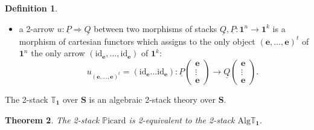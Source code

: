 \documentclass[11pt]{amsart}
\newcommand{\PICARD}{\mathbb{P}\mathrm{icard}}
\newcommand{\id}{\mathrm{id}}
\newcommand{\bS}{\textbf{S}}
\newcommand{\bfu}{\textbf{1}}
\newcommand{\twoT}{\mathbb{T}}
\newcommand{\Alg}{\mathrm{Alg}}
\newtheorem{theorem}{Theorem}[section]
\theoremstyle{definition}
\newtheorem{definition}[theorem]{Definition}
\numberwithin{equation}{section}
\begin{document}
\begin{definition}
\begin{itemize}
	$QP$ is the product of the two matrices $Q$ and $P$.
	\item a 2-arrow $u: \underline{P} \Rightarrow \underline{Q}$ between two morphisms of stacks $\underline {Q}, \underline{P}: \bfu^n \to \bfu^k$ is a morphism of cartesian functors which assigns to the only object $(\mathbf{e}, \dots, \mathbf{e})^t$ of $\bfu^n$ the only arrow  $(\id_\mathbf{e}, \dots, \id_\mathbf{e})$ of $\bfu^k$:
	\begin{equation}\label{arrow1^k}
\qquad		u_{(\mathbf{e}, \dots, \mathbf{e})^t} = ( \id_\mathbf{e} \dots \id_\mathbf{e}) :  \underline{P} \left(\begin{matrix} \mathbf{e} \\ \vdots \\ \mathbf{e}\end{matrix}\right) \longrightarrow   \underline{Q} \left(\begin{matrix} \mathbf{e} \\ \vdots \\ \mathbf{e}\end{matrix}\right).
	\end{equation}	
\end{itemize}
\end{definition}

 The 2-stack $\twoT_{\bfu}$ over $\bS$ is an algebraic 2-stack theory over $\bS$.


\begin{theorem}\label{Teo}
	The 2-stack $\PICARD$ is 2-equivalent to the 2-stack $\Alg \twoT_{\bfu} .$ 
\end{theorem}
\end{document}
